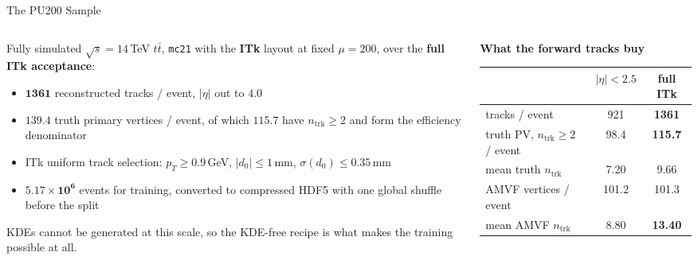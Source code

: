\documentclass[xcolor=table,aspectratio=169]{beamer}
\newcommand{\ntrk}{\ensuremath{n_\mathrm{trk}}}
\begin{document}
\begin{frame}{The PU200 Sample}
    \begin{columns}[t]
        \begin{column}{0.52\linewidth}
            \small
            Fully simulated $\sqrt{s}=14$\,TeV $t\bar t$, \texttt{mc21} with the
            \textbf{ITk} layout at fixed $\mu=200$, over the \textbf{full ITk
            acceptance}:
            \begin{itemize}\setlength\itemsep{0.25em}
                \item $\mathbf{1361}$ reconstructed tracks / event, $|\eta|$ out to $4.0$
                \item $\mathbf{139.4}$ truth primary vertices / event, of which
                    $\mathbf{115.7}$ have $\ntrk\geq2$ and form the efficiency
                    denominator
                \item ITk uniform track selection: $p_T\!\ge\!0.9$\,GeV,
                    $|d_0|\!\le\!1$\,mm, $\sigma(d_0)\!\le\!0.35$\,mm
                \item $\mathbf{5.17\times10^{6}}$ events for training, converted to
                    compressed HDF5 with one global shuffle before the split
            \end{itemize}
            \vspace{0.4em}
            {\footnotesize\textcolor{black!55}{KDEs cannot be generated at this scale,
            so the KDE-free recipe is what makes the training possible at all.}}
        \end{column}
        \begin{column}{0.46\linewidth}
            \centering
            \small
            \textbf{What the forward tracks buy}
            \vspace{0.3em}
            {\footnotesize
            \begin{tabular}{lcc}
                \toprule
                 & $|\eta|<2.5$ & full ITk \\
                \midrule
                tracks / event                 & 921  & \textbf{1361} \\
                truth PV, $\ntrk\ge2$ / event  & 98.4 & \textbf{115.7} \\
                mean truth \ntrk               & 7.20 & 9.66 \\
                AMVF vertices / event          & 101.2 & 101.3 \\
                mean AMVF \ntrk                & 8.80 & \textbf{13.40} \\
                \bottomrule
            \end{tabular}}
            \vspace{0.6em}


\end{column}
\end{columns}
\end{frame}
\end{document}
